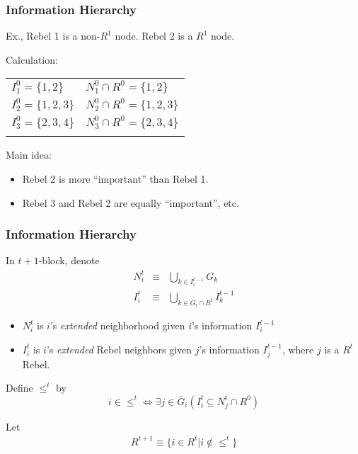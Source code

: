 \documentclass[10pt]{beamer}
\begin{document}
\begin{frame}
  \frametitle{Information Hierarchy}

Ex., Rebel 1 is a non-$R^1$ node. Rebel 2 is a $R^1$ node. 

 \begin{center}
\end{center}

Calculation:

\begin{table}[h]
\begin{tabular}{l l}
$I^0_1=\{1,2\} $ &  $N^0_1\cap R^0=\{1,2\}$  \\
$I^0_2=\{1,2,3\}$ & $N^0_2\cap R^0=\{1,2,3\} $  \\
$I^0_3=\{2,3,4\}$ & $N^0_3\cap R^0=\{2,3,4\}$    \\
 &  
\end{tabular}
\end{table}

Main idea:
\begin{itemize}
\item Rebel 2 is more ``important'' than Rebel 1.
\item Rebel 3 and Rebel 2 are equally ``important'', etc.
\end{itemize}


\end{frame}





\begin{frame}
  \frametitle{Information Hierarchy}

In $t+1$-block, denote
\begin{eqnarray*}
N^t_i & \equiv & \bigcup_{k\in I^{t-1}_i}G_k \\
I^t_i & \equiv & \bigcup_{k\in G_i\cap R^t}I^{t-1}_k
\end{eqnarray*}
\begin{itemize}
\item $N^t_i$ is $i$'s \textit{extended} neighborhood given $i$'s information $I^{t-1}_i$
\item $I^t_i$ is $i$'s \textit{extended} Rebel neighbors given $j$'s information $I^{t-1}_j$, where $j$ is a $R^{t}$ Rebel. 
\end{itemize}


Define $\leq^t$ by
\[i\in \leq^t \Leftrightarrow \exists j\in \bar{G}_i(I^t_i\subseteq N^t_j\cap R^0)\] 


Let 
\begin{eqnarray*}
R^{t+1} \equiv  \{i\in R^t|i\notin \leq^t\}
\end{eqnarray*}


\end{frame}
\end{document}
